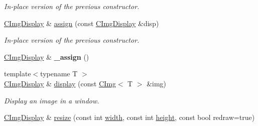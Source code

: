 \begin{DoxyCompactItemize}
\begin{DoxyCompactList}\small\item\em In-\/place version of the previous constructor. \item\end{DoxyCompactList}\item 
\hypertarget{structcimg__library_1_1_c_img_display_a61aff2566959152ed1f9f36f172d08ed}{
\hyperlink{structcimg__library_1_1_c_img_display}{CImgDisplay} \& \hyperlink{structcimg__library_1_1_c_img_display_a61aff2566959152ed1f9f36f172d08ed}{assign} (const \hyperlink{structcimg__library_1_1_c_img_display}{CImgDisplay} \&disp)}
\label{structcimg__library_1_1_c_img_display_a61aff2566959152ed1f9f36f172d08ed}

\begin{DoxyCompactList}\small\item\em In-\/place version of the previous constructor. \item\end{DoxyCompactList}\item 
\hypertarget{structcimg__library_1_1_c_img_display_a92a816ec4ada0cbacc82669c735101bf}{
\hyperlink{structcimg__library_1_1_c_img_display}{CImgDisplay} \& {\bfseries \_\-assign} ()}
\label{structcimg__library_1_1_c_img_display_a92a816ec4ada0cbacc82669c735101bf}

\item 
\hypertarget{structcimg__library_1_1_c_img_display_a3ad00bf4853678899cdf2b929d093eef}{
{\footnotesize template$<$typename T $>$ }\\\hyperlink{structcimg__library_1_1_c_img_display}{CImgDisplay} \& \hyperlink{structcimg__library_1_1_c_img_display_a3ad00bf4853678899cdf2b929d093eef}{display} (const \hyperlink{structcimg__library_1_1_c_img}{CImg}$<$ T $>$ \&img)}
\label{structcimg__library_1_1_c_img_display_a3ad00bf4853678899cdf2b929d093eef}

\begin{DoxyCompactList}\small\item\em Display an image in a window. \item\end{DoxyCompactList}\item 
\hypertarget{structcimg__library_1_1_c_img_display_aa344f0c6fcb96dad2b6a399a7b707d57}{
\hyperlink{structcimg__library_1_1_c_img_display}{CImgDisplay} \& \hyperlink{structcimg__library_1_1_c_img_display_aa344f0c6fcb96dad2b6a399a7b707d57}{resize} (const int \hyperlink{structcimg__library_1_1_c_img_display_a98cd64f739f893359ec77105d65cfbb7}{width}, const int \hyperlink{structcimg__library_1_1_c_img_display_a0d9b09a5ee557d2a5e2380b642ebbf05}{height}, const bool redraw=true)}
\label{structcimg__library_1_1_c_img_display_aa344f0c6fcb96dad2b6a399a7b707d57}


\end{DoxyCompactItemize}
